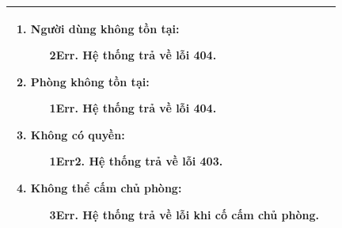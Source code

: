 {\begin{tabularx}{\textwidth}{|>{\raggedright\arraybackslash}X|>{\raggedright\arraybackslash}X|}
\begin{enumerate}
    \item \textbf{Người dùng không tồn tại:}
    \begin{enumerate}
        \item[2Err.] Hệ thống trả về lỗi 404.
    \end{enumerate}
    \item \textbf{Phòng không tồn tại:}
    \begin{enumerate}
        \item[1Err.] Hệ thống trả về lỗi 404.
    \end{enumerate}
    \item \textbf{Không có quyền:}
    \begin{enumerate}
        \item[1Err2.] Hệ thống trả về lỗi 403.
    \end{enumerate}
    \item \textbf{Không thể cấm chủ phòng:}
    \begin{enumerate}
        \item[3Err.] Hệ thống trả về lỗi khi cố cấm chủ phòng.
    \end{enumerate}
\end{enumerate} \\
\hline
\end{tabularx}
}
